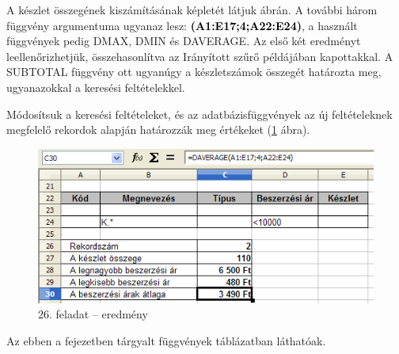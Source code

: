A készlet összegének kiszámításának képletét látjuk
 ábrán. A további három függvény argumentuma ugyanaz
lesz: \textsf{\textbf{\textcolor{black}{(A1:E17;4;A22:E24)}}}, a
használt függvények pedig DMAX, DMIN és DAVERAGE. Az első
két eredményt leellenőrizhetjük, összehasonlítva az
Irányított szűrő példájában kapottakkal. A SUBTOTAL
függvény ott ugyanúgy a készletszámok összegét
határozta meg, ugyanazokkal a keresési feltételekkel.

Módosítsuk a keresési feltételeket, és az
adatbázisfüggvények az új feltételeknek megfelelő
rekordok alapján határozzák meg értékeket (\ref{26-feladatEredmény} ábra).

\begin{figure}[!h]
\begin{center}
\includegraphics[width=12.36cm]{oocalcv1-img121.png}
\caption{26. feladat --  eredmény}\label{26-feladatEredmény}
\end{center}
\end{figure}

Az ebben a fejezetben tárgyalt függvények 
táblázatban láthatóak.

